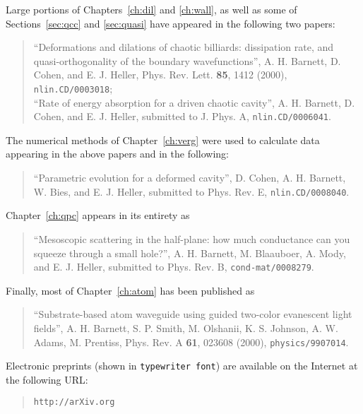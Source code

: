 \begin{citations}

\vspace{0.8in}

\ssp
\noindent
Large portions of Chapters~\ref{ch:dil} and \ref{ch:wall}, as well as some
of Sections~\ref{sec:qcc} and \ref{sec:quasi}
have appeared in the following two papers:
\begin{quote}
	``Deformations and dilations of chaotic billiards:
	dissipation rate, and quasi-orthogonality of the boundary
	wavefunctions'',
	A. H. Barnett, D. Cohen, and E. J. Heller,
	Phys. Rev. Lett. {\bf 85}, 1412 (2000), {\tt nlin.CD/0003018};
	\vspace{.1in} \\
	``Rate of energy absorption for a driven chaotic cavity'',
	A. H. Barnett, D. Cohen, and E. J. Heller,
	submitted to J. Phys. A, {\tt nlin.CD/0006041}.
\end{quote}
The numerical methods of
Chapter~\ref{ch:verg} were used to calculate data appearing in the above
papers and in the following:
\begin{quote}
	``Parametric evolution for a deformed cavity'',
	D. Cohen, A. H. Barnett, W. Bies, and E. J. Heller,
	submitted to Phys. Rev. E, {\tt nlin.CD/0008040}.
\end{quote}
Chapter~\ref{ch:qpc} appears in its entirety as
\begin{quote}
	``Mesoscopic scattering in the half-plane:
	how much conductance can you squeeze through a small hole?'',
	A. H. Barnett, M. Blaauboer, A. Mody, and E. J. Heller,
	submitted to Phys. Rev. B,
	{\tt cond-mat/0008279}.
\end{quote}
Finally, most of Chapter~\ref{ch:atom} has been published as
\begin{quote}
	``Substrate-based atom waveguide using guided two-color
	evanescent light fields'',
	A. H. Barnett, S. P. Smith, M. Olshanii, K. S. Johnson,
	A. W. Adams, M. Prentiss,
	Phys. Rev. A {\bf 61}, 023608 (2000), {\tt physics/9907014}.
\end{quote}
Electronic preprints (shown in {\tt typewriter font}) are available
on the Internet at the following URL:
\begin{quote}
	{\tt http://arXiv.org}
\end{quote}
\end{citations}




